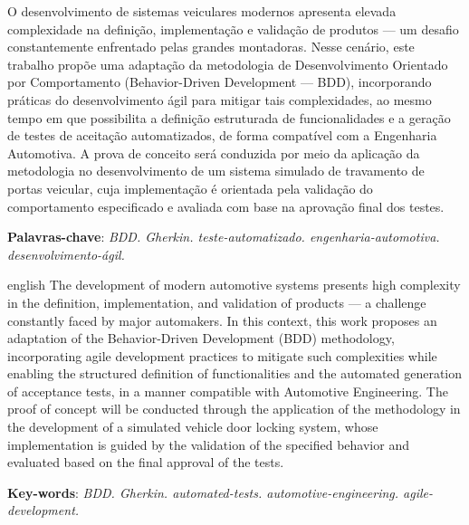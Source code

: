 \setlength{\absparsep}{18pt} %
\begin{resumo}
	O desenvolvimento de sistemas veiculares modernos apresenta elevada complexidade na definição, implementação e validação de produtos — um desafio constantemente 
	enfrentado pelas grandes montadoras. Nesse cenário, este trabalho propõe uma adaptação da metodologia de Desenvolvimento Orientado por Comportamento (Behavior-Driven 
	Development — BDD), incorporando práticas do desenvolvimento ágil para mitigar tais complexidades, ao mesmo tempo em que possibilita a definição estruturada de 
	funcionalidades e a geração de testes de aceitação automatizados, de forma compatível com a Engenharia Automotiva. A prova de conceito será conduzida por meio da 
	aplicação da metodologia no desenvolvimento de um sistema simulado de travamento de portas veicular, cuja implementação é orientada pela validação do comportamento 
	especificado e avaliada com base na aprovação final dos testes.
	\vspace{\onelineskip}
    \noindent

	\textbf{Palavras-chave}: \textit{BDD. Gherkin. teste-automatizado. engenharia-automotiva. desenvolvimento-ágil.}

\end{resumo}

\begin{resumo}[Abstract]
\begin{otherlanguage*}{english}
	The development of modern automotive systems presents high complexity in the definition, implementation, and validation of products — a challenge constantly 
	faced by major automakers. In this context, this work proposes an adaptation of the Behavior-Driven Development (BDD) methodology, incorporating agile 
	development practices to mitigate such complexities while enabling the structured definition of functionalities and the automated generation of acceptance 
	tests, in a manner compatible with Automotive Engineering. The proof of concept will be conducted through the application of the methodology in the 
	development of a simulated vehicle door locking system, whose implementation is guided by the validation of the specified behavior and evaluated based 
	on the final approval of the tests.
	\vspace{\onelineskip}
	\noindent

	\textbf{Key-words}: \textit{BDD. Gherkin. automated-tests. automotive-engineering. agile-development.}

\end{otherlanguage*}
\end{resumo}



